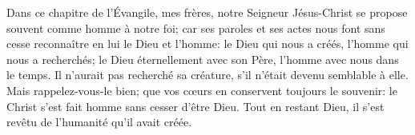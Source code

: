 Dans ce chapitre de l’Évangile, mes frères,
	notre Seigneur Jésus-Christ se propose souvent comme homme à notre foi;
	car ses paroles et ses actes nous font sans cesse reconnaître en lui
		le Dieu et l’homme:
	le Dieu qui nous a créés, l’homme qui nous a recherchés;
	le Dieu éternellement avec son Père, l’homme avec nous dans le temps.
Il n’aurait pas recherché sa créature, s’il n’était devenu semblable à elle.
Mais rappelez-vous-le bien; que vos cœurs en conservent toujours le souvenir:
	le Christ s’est fait homme sans cesser d’être Dieu.
Tout en restant Dieu, il s’est revêtu de l’humanité qu’il avait créée.

